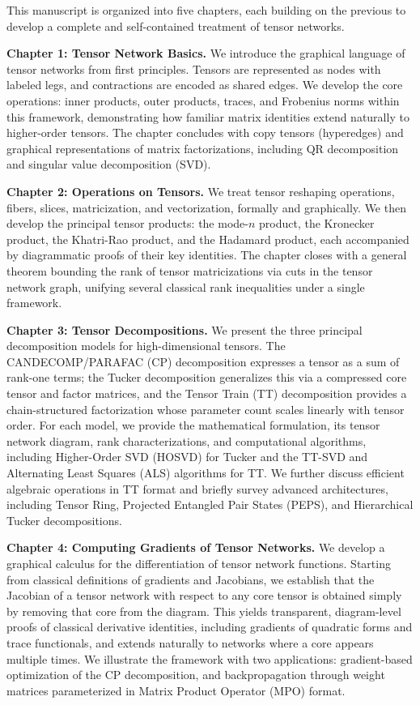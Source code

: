 This manuscript is organized into five chapters, each building on the previous to develop 
a complete and self-contained treatment of tensor networks.

\medskip
\noindent\textbf{Chapter 1: Tensor Network Basics.}
We introduce the graphical language of tensor networks from first principles. Tensors are 
represented as nodes with labeled legs, and contractions are encoded as shared edges. We 
develop the core operations: inner products, outer products, traces, and Frobenius norms within this framework, demonstrating how familiar matrix identities extend naturally to 
higher-order tensors. The chapter concludes with copy tensors (hyperedges) and graphical 
representations of matrix factorizations, including QR decomposition and singular value 
decomposition (SVD).

\medskip
\noindent\textbf{Chapter 2: Operations on Tensors.}
We treat tensor reshaping operations, fibers, slices, matricization, and vectorization, formally and graphically. We then develop the principal tensor products: the mode-$n$ 
product, the Kronecker product, the Khatri-Rao product, and the Hadamard product, each accompanied by diagrammatic proofs of their key identities. The chapter closes with a general theorem bounding the rank of tensor matricizations via cuts in the tensor network graph, unifying several classical rank inequalities under a single framework.

\medskip
\noindent\textbf{Chapter 3: Tensor Decompositions.}
We present the three principal decomposition models for high-dimensional tensors. The CANDECOMP/PARAFAC (CP) decomposition expresses a tensor as a sum of rank-one terms; the Tucker decomposition generalizes this via a compressed core tensor and factor matrices,
and the Tensor Train (TT) decomposition provides a chain-structured factorization whose parameter count scales linearly with tensor order. For each model, we provide the mathematical formulation, its tensor network diagram, rank characterizations, and computational algorithms, including Higher-Order SVD (HOSVD) for Tucker and the TT-SVD and Alternating Least Squares (ALS) algorithms for TT. We further discuss efficient algebraic operations in TT format and briefly survey advanced architectures, including Tensor Ring, Projected Entangled Pair States (PEPS), and Hierarchical Tucker decompositions.

\medskip
\noindent\textbf{Chapter 4: Computing Gradients of Tensor Networks.}
We develop a graphical calculus for the differentiation of tensor network functions. Starting 
from classical definitions of gradients and Jacobians, we establish that the Jacobian of a tensor network with respect to any core tensor is obtained simply by removing that core from the diagram. This yields transparent, diagram-level proofs of classical derivative 
identities, including gradients of quadratic forms and trace functionals, and extends naturally to networks where a core appears multiple times. We illustrate the framework with two applications: gradient-based optimization of 
the CP decomposition, and backpropagation through weight matrices parameterized in 
Matrix Product Operator (MPO) format.

